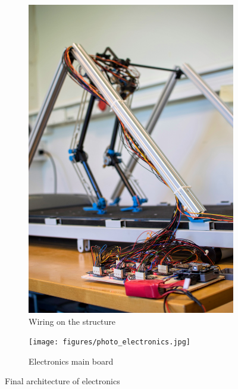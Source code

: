 \begin{figure}[ht]
\centering
	\begin{subfigure}[b]{0.4\textwidth}
		\includegraphics[width=\textwidth]{figures/photo_electronics_2.jpg}
		\caption{Wiring on the structure}
		\label{fig:electronics1}
	\end{subfigure}
	\begin{subfigure}[b]{0.4\textwidth}
		\texttt{[image: figures/photo\_electronics.jpg]}
		\caption{Electronics main board}
		\label{fig:electronics2}
	\end{subfigure}
	\caption{Final architecture of electronics}
\end{figure}



